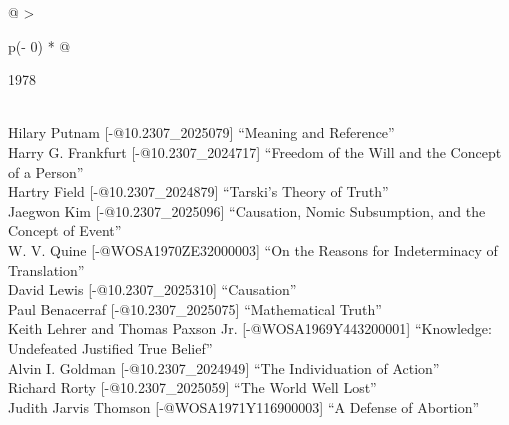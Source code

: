 \documentclass[
  10pt,
  letterpaper,
  DIV=11,
  numbers=noendperiod,
  twoside]{scrartcl}
\begin{document}
\begin{longtable}[]{@{}
  >{\raggedright\arraybackslash}p{(\columnwidth - 0\tabcolsep) * }@{}}

\caption{\label{tbl-top-ten-1969}Most cited articles published less than
ten years ago as of 1978.}

\tabularnewline

\toprule\noalign{}
\begin{minipage}[b]{\linewidth}\raggedright
1978
\end{minipage} \\
\midrule\noalign{}
\endhead
\bottomrule\noalign{}
\endlastfoot
Hilary Putnam {[}-@10.2307\_2025079{]} ``Meaning and Reference'' \\
Harry G. Frankfurt {[}-@10.2307\_2024717{]} ``Freedom of the Will and
the Concept of a Person'' \\
Hartry Field {[}-@10.2307\_2024879{]} ``Tarski's Theory of Truth'' \\
Jaegwon Kim {[}-@10.2307\_2025096{]} ``Causation, Nomic Subsumption, and
the Concept of Event'' \\
W. V. Quine {[}-@WOSA1970ZE32000003{]} ``On the Reasons for
Indeterminacy of Translation'' \\
David Lewis {[}-@10.2307\_2025310{]} ``Causation'' \\
Paul Benacerraf {[}-@10.2307\_2025075{]} ``Mathematical Truth'' \\
Keith Lehrer and Thomas Paxson Jr. {[}-@WOSA1969Y443200001{]}
``Knowledge: Undefeated Justified True Belief'' \\
Alvin I. Goldman {[}-@10.2307\_2024949{]} ``The Individuation of
Action'' \\
Richard Rorty {[}-@10.2307\_2025059{]} ``The World Well Lost'' \\
Judith Jarvis Thomson {[}-@WOSA1971Y116900003{]} ``A Defense of
Abortion'' \\

\end{longtable}
\end{document}
